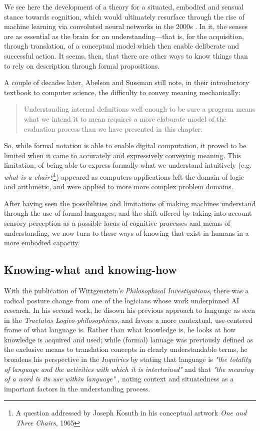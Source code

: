 We see here the development of a theory for a situated, embodied and sensual stance towards cognition, which would ultimately resurface through the rise of machine learning via convoluted neural networks in the 2000s \citep{nilsson_quest_2009}. In it, the senses are as essential as the brain for an understanding—that is, for the acquisition, through translation, of a conceptual model which then enable deliberate and successful action. It seems, then, that there are other ways to know things than to rely on description through formal propositions.

A couple of decades later, Abelson and Sussman still note, in their introductory textbook to computer science, the difficulty to convey meaning mechanically:

\begin{quote}
    Understanding internal definitions well enough to be sure a program means what we intend it to mean requires a more elaborate model of the evaluation process than we have presented in this chapter. \citep{abelson_structure_1979}
\end{quote}

So, while formal notation is able to enable digital computation, it proved to be limited when it came to accurately and expressively  conveying meaning. This limitation, of being able to express formally what we understand intuitively (e.g. \emph{what is a chair?}\footnote{A question addressed by Joseph Kosuth in his conceptual artwork \emph{One and Three Chairs}, 1965}) appeared as computers applications left the domain of logic and arithmetic, and were applied to more more complex problem domains. 

After having seen the possibilities and limitations of making machines understand through the use of formal languages, and the shift offered by taking into account sensory perception as a possible locus of cognitive processes and means of understanding, we now turn to these ways of knowing that exist in humans in a more embodied capacity.

\subsection{Knowing-what and knowing-how}
\label{subsec:knowing-what-how}

With the publication of Wittgenstein's \emph{Philosophical Investigations}, there was a radical posture change from one of the logicians whose work underpinned AI research. In his second work, he disown his previous approach to language as seen in the \emph{Tractatus Logico-philosophicus}, and favors a more contextual, use-centered frame of what language is. Rather than what knowledge is, he looks at how knowledge is acquired and used; while (formal) lanuage was previously defined as the exclusive means to translation concepts in clearly understandable terms, he broadens his perspective in the \emph{Inquiries} by stating that language is \emph{"the totality of language and the activities with which it is intertwined"} and that \emph{"the meaning of a word is its use within language"} \citep{wittgenstein_recherches_2004}, noting context and situatedness as a important factors in the understanding process.

